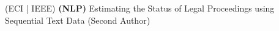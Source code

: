 (ECI | IEEE) \textbf{(NLP)}{ Estimating the Status of Legal Proceedings using Sequential Text Data (Second Author)} \\
